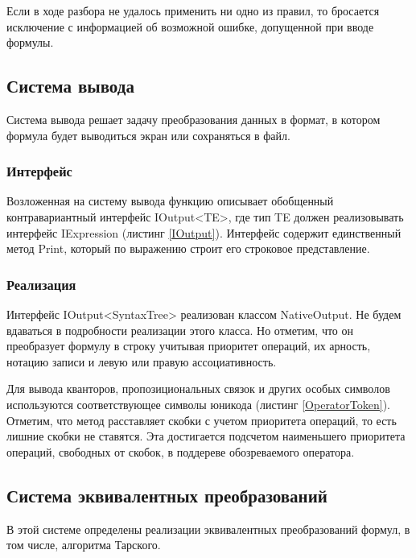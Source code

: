 Если в ходе разбора не удалось применить ни одно из правил, то бросается исключение с информацией об возможной ошибке, допущенной при вводе формулы.

\subsection{Система вывода}

Система вывода решает задачу преобразования данных в формат, в котором формула будет выводиться экран или сохраняться в файл.


\subsubsection{Интерфейс}

Возложенная на систему вывода функцию описывает обобщенный контравариантный интерфейс IOutput<TE>, где тип TE должен реализовывать интерфейс IExpression (листинг \ref{IOutput}). Интерфейс содержит единственный метод Print, который по выражению строит его строковое представление.



\subsubsection{Реализация}

Интерфейс IOutput<SyntaxTree> реализован классом NativeOutput. Не будем вдаваться в подробности реализации этого класса. Но отметим, что он преобразует формулу в строку учитывая приоритет операций, их арность, нотацию записи и левую или правую ассоциативность. 

Для вывода кванторов, пропозициональных связок и других особых символов используются соответствующее символы юникода (листинг \ref{OperatorToken}). Отметим, что метод расставляет скобки с учетом приоритета операций, то есть лишние скобки не ставятся. Эта достигается подсчетом наименьшего приоритета операций, свободных от скобок, в поддереве обозреваемого оператора.
\subsection{Система эквивалентных преобразований}

В этой системе определены реализации эквивалентных преобразований формул, в том числе, алгоритма Тарского.

